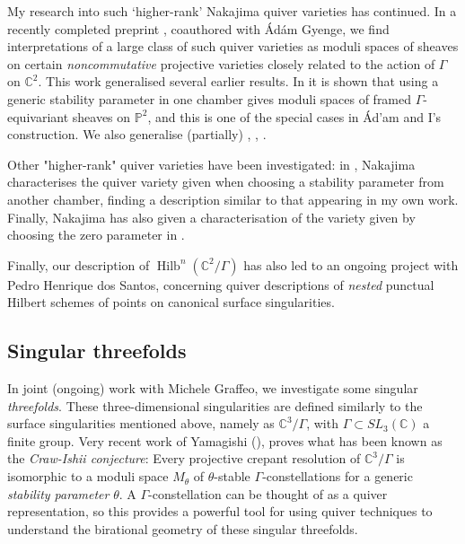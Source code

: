 \documentclass[11pt,a4paper ]{article}        %
\newcommand{\C}{\mathbb{C}}    						%
\renewcommand{\P}{\mathbb{P}}  						%
\newcommand{\Hilb}{\operatorname{Hilb}}
\begin{document}
My research into such `higher-rank' Nakajima quiver varieties has continued. In a recently completed preprint \cite{GamGye}, coauthored with \'Ad\'am Gyenge, we find interpretations of a large class of such quiver varieties as moduli spaces of sheaves on certain \emph{noncommutative} projective varieties closely related to the action of $\Gamma$ on $\C^2$. %
This work generalised several earlier results. In \cite{VaVa} it is shown that using a generic stability parameter in one chamber gives moduli spaces of framed $ \Gamma $-equivariant sheaves on $ \P^2 $, and this is one of the special cases in \'Ad'am and I's construction. We also generalise (partially) \cite{BGK}, \cite{CGGS2}, \cite{Paper1}.

Other "higher-rank" quiver varieties have been investigated: in \cite{NakaALE}, Nakajima characterises the quiver variety given when choosing a stability parameter from another chamber, finding a description similar to that appearing in my own work. 
Finally, Nakajima has also given a characterisation of the variety given by choosing the zero parameter in \cite{Nak02}. 

Finally,  our description of $\Hilb^n(\C^2/\Gamma)$ has also led to an ongoing project with Pedro Henrique dos Santos, concerning quiver descriptions of \emph{nested} punctual Hilbert schemes of points on canonical surface singularities. 

\subsection*{Singular threefolds}
In joint (ongoing) work with Michele Graffeo, we investigate some singular \emph{threefolds}. These three-dimensional singularities are defined similarly to the surface singularities mentioned above, namely as $\C^3/\Gamma$, with $\Gamma\subset SL_3(\C)$ a finite group. Very recent work of Yamagishi (\cite{Yamagishi}), proves what has been known as the \emph{Craw-Ishii conjecture}: Every projective crepant resolution of $\C^3/\Gamma$ is isomorphic to a moduli space $M_\theta $ of $\theta$-stable $\Gamma$-constellations for a generic \emph{stability parameter} $\theta$. 
A $\Gamma$-constellation can be thought of as a quiver representation, so this provides a powerful tool for using quiver techniques to understand the birational geometry of these singular threefolds. %
\end{document}
